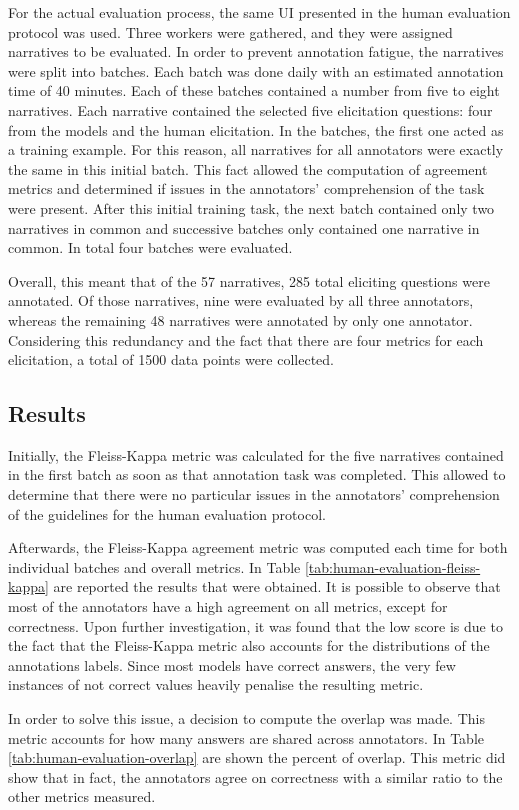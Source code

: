 For the actual evaluation process, the same UI presented in the human evaluation protocol was used. %
Three workers were gathered, and they were assigned narratives to be evaluated.  
In order to prevent annotation fatigue, the narratives were split into batches. Each batch was done daily with an estimated annotation time of 40 minutes. Each of these batches contained a number from five to eight narratives. Each narrative contained the selected five elicitation questions: four from the models and the human elicitation. In the batches, the first one acted as a training example. For this reason, all narratives for all annotators were exactly the same in this initial batch. This fact allowed the computation of agreement metrics and determined if issues in the annotators' comprehension of the task were present. After this initial training task, the next batch contained only two narratives in common and successive batches only contained one narrative in common. In total four batches were evaluated.

Overall, this meant that of the 57 narratives, 285 total eliciting questions were annotated. Of those narratives, nine were evaluated by all three annotators, whereas the remaining 48 narratives were annotated by only one annotator. Considering this redundancy and the fact that there are four metrics for each elicitation, a total of 1500 data points were collected.


\subsection{Results}
Initially, the Fleiss-Kappa \cite{fleiss} metric was calculated for the five narratives contained in the first batch as soon as that annotation task was completed. This allowed to determine that there were no particular issues in the annotators' comprehension of the guidelines for the human evaluation protocol.


Afterwards, the Fleiss-Kappa agreement metric was computed each time for both individual batches and overall metrics. In Table \ref{tab:human-evaluation-fleiss-kappa} are reported the results that were obtained. It is possible to observe that most of the annotators have a high agreement on all metrics, except for correctness. Upon further investigation, it was found that the low score is due to the fact that the Fleiss-Kappa metric also accounts for the distributions of the annotations labels. Since most models have correct answers, the very few instances of not correct values heavily penalise the resulting metric.

In order to solve this issue, a decision to compute the overlap was made. This metric accounts for how many answers are shared across annotators. In Table \ref{tab:human-evaluation-overlap} are shown the percent of overlap. This metric did show that in fact, the annotators agree on correctness with a similar ratio to the other metrics measured. 



